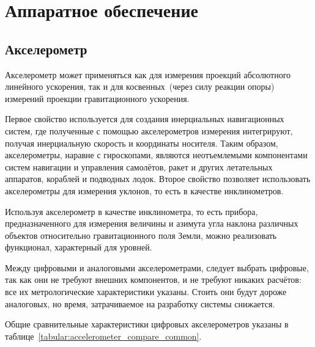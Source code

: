 \documentclass[document.tex]{subfiles}
\begin{document}
\section{Аппаратное обеспечение}
\subsection{Акселерометр}
Акселерометр может применяться как для измерения проекций абсолютного линейного
ускорения, так и для косвенных~(через силу реакции опоры) измерений проекции
гравитаци\-онного ускорения.

Первое свойство используется для создания инерциальных навигационных систем, где
полученные с помощью акселерометров измерения интегрируют, получая
инерци\-альную ско\-рость и координаты носителя. Таким образом, акселерометры, наравне с
гироско\-пами, являются неотъемлемыми компонентами систем навигации и управления
самолётов, ракет и других летательных аппаратов, кораблей и подводных лодок.
Второе свойство позволяет использовать акселерометры для измерения уклонов, то
есть в качестве инклино\-метров.\cite{accelerometer_info}

Используя акселерометр в качестве инклинометра, то есть прибора,
предназначенного для измерения величины и азимута угла наклона различных
объектов относительно гравита\-ционного поля Земли, можно реализовать функционал,
характерный для уровней.

Между цифровыми и аналоговыми акселерометрами, следует выбрать цифровые, так
как они не требуют внешних компонентов, и не требуют никаких расчётов: все их
метро\-логические характеристики указаны. Стоить они будут дороже аналоговых, но
время, затра\-чиваемое на разработку системы
снижается.\cite{accelerometer_compare}

Общие сравнительные характеристики цифровых акселерометров указаны в таблице~\ref{tabular:accelerometer_compare_common}.
\end{document}
